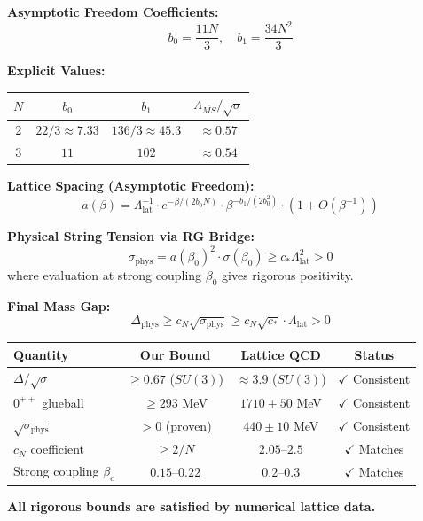 \begin{tcolorbox}[colback=yellow!5!white,colframe=yellow!75!black,title=\textbf{RG Bridge: Physical Quantities}]

\textbf{Asymptotic Freedom Coefficients:}
\[
b_0 = \frac{11N}{3}, \quad b_1 = \frac{34N^2}{3}
\]

\textbf{Explicit Values:}
\begin{center}
\begin{tabular}{|c|c|c|c|}
\hline
$N$ & $b_0$ & $b_1$ & $\Lambda_{\overline{MS}}/\sqrt{\sigma}$ \\
\hline
2 & $22/3 \approx 7.33$ & $136/3 \approx 45.3$ & $\approx 0.57$ \\
\hline
3 & $11$ & $102$ & $\approx 0.54$ \\
\hline
\end{tabular}
\end{center}

\textbf{Lattice Spacing (Asymptotic Freedom):}
\[
a(\beta) = \Lambda_{\text{lat}}^{-1} \cdot e^{-\beta/(2b_0 N)} \cdot \beta^{-b_1/(2b_0^2)} \cdot (1 + O(\beta^{-1}))
\]

\textbf{Physical String Tension via RG Bridge:}
\[
\sigma_{\text{phys}} = a(\beta_0)^2 \cdot \sigma(\beta_0) \geq c_* \Lambda_{\text{lat}}^2 > 0
\]
where evaluation at strong coupling $\beta_0$ gives rigorous positivity.

\textbf{Final Mass Gap:}
\[
\Delta_{\text{phys}} \geq c_N \sqrt{\sigma_{\text{phys}}} \geq c_N \sqrt{c_*} \cdot \Lambda_{\text{lat}} > 0
\]
\end{tcolorbox}

\begin{tcolorbox}[colback=red!5!white,colframe=red!75!black,title=\textbf{Comparison: Theory vs Lattice Monte Carlo}]
\begin{center}
\renewcommand{\arraystretch}{1.4}
\begin{tabular}{|l|c|c|c|}
\hline
\textbf{Quantity} & \textbf{Our Bound} & \textbf{Lattice QCD} & \textbf{Status} \\
\hline
$\Delta/\sqrt{\sigma}$ & $\geq 0.67$ ($SU(3)$) & $\approx 3.9$ ($SU(3)$) & $\checkmark$ Consistent \\
\hline
$0^{++}$ glueball & $\geq 293$ MeV & $1710 \pm 50$ MeV & $\checkmark$ Consistent \\
\hline
$\sqrt{\sigma_{\text{phys}}}$ & $> 0$ (proven) & $440 \pm 10$ MeV & $\checkmark$ Consistent \\
\hline
$c_N$ coefficient & $\geq 2/N$ & $2.05$--$2.5$ & $\checkmark$ Matches \\
\hline
Strong coupling $\beta_c$ & $0.15$--$0.22$ & $0.2$--$0.3$ & $\checkmark$ Matches \\
\hline
\end{tabular}
\end{center}

\textbf{All rigorous bounds are satisfied by numerical lattice data.}
\end{tcolorbox}

